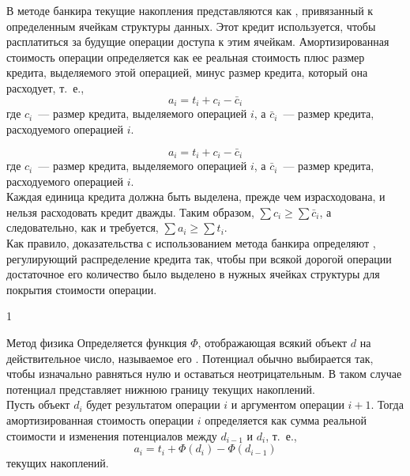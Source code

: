 \begin{frame}[fragile]{}
 В методе банкира
текущие накопления представляются как ,
привязанный к определенным ячейкам структуры данных. Этот кредит
используется, чтобы расплатиться за будущие операции доступа к этим
ячейкам.  Амортизированная стоимость операции определяется как ее
реальная стоимость плюс размер кредита, выделяемого этой операцией,
минус размер кредита, который она расходует, т.~е.,
$$
a_i = t_i + c_i - \bar{c}_i
$$
где $c_i$~--- размер кредита, выделяемого операцией $i$, а $\bar{c}_i$~---
размер кредита, расходуемого операцией $i$.


\end{frame}

\begin{frame}[fragile]{}
$$
a_i = t_i + c_i - \bar{c}_i
$$
где $c_i$~--- размер кредита, выделяемого операцией $i$, а $\bar{c}_i$~---
размер кредита, расходуемого операцией $i$.\\

 Каждая единица кредита
должна быть выделена, прежде чем израсходована, и нельзя расходовать
кредит дважды. Таким образом, $\sum c_i \ge \sum \bar{c}_i$, а
следовательно, как и требуется, $\sum a_i \ge \sum t_i$.\\

Как правило,
доказательства с использованием метода банкира определяют
, регулирующий распределение
кредита так, чтобы при всякой дорогой операции достаточное его
количество было выделено в нужных ячейках структуры для покрытия
стоимости операции.
\end{frame}


\begin{frame}[fragile]{}
1
\end{frame}

\begin{frame}[fragile]{Метод физика}
Определяется функция $\Phi$, отображающая всякий
объект $d$ на действительное число, называемое его
.  Потенциал обычно выбирается так, чтобы
изначально равняться нулю и оставаться неотрицательным. В таком случае
потенциал представляет нижнюю границу  текущих накоплений.\\

Пусть объект $d_i$ будет результатом операции $i$ и аргументом
операции $i+1$. Тогда амортизированная стоимость операции $i$
определяется как сумма реальной стоимости и изменения потенциалов между
$d_{i-1}$ и $d_i$, т.~е.,
$$
a_i = t_i + \Phi(d_i) - \Phi(d_{i-1})
$$
текущих накоплений.


\end{frame}


